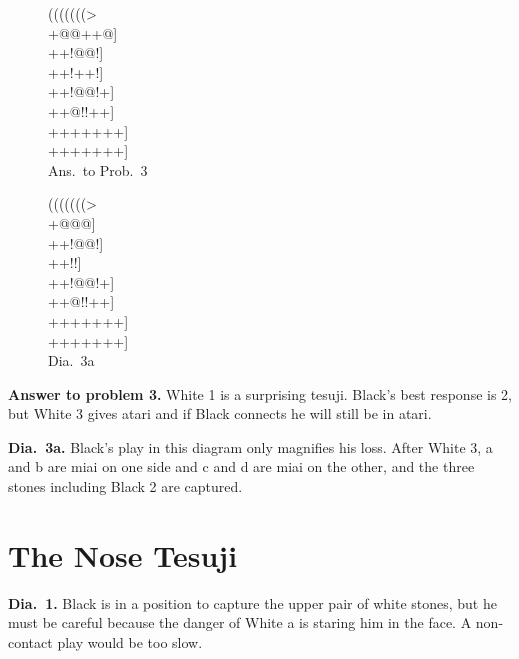 \documentclass[mcrownvopaper,10pt,twopage,onecolumn,final]{memoir}
\begin{document}
\begin{figure}[ht]
    \begin{minipage}[c]{0.50\linewidth}
        \centering    
        {\gnos%
        (((((((>\\
        +@@+{\gnosb{}}+@]\\
        ++!@{\gnosw{}}@!]\\
        ++!+{\gnosw{}}+!]\\
        ++!@@!+]\\
        ++@!!++]\\
        +++++++]\\
        +++++++]\\
        }
        Ans.\ to Prob.\ 3
    \end{minipage}%
    \begin{minipage}[c]{0.50\linewidth}
        \centering    
        {\gnos%
        (((((((>\\
        +@@@]\\
        ++!@{\gnosw{}}@!]\\
        ++!!]\\
        ++!@@!+]\\
        ++@!!++]\\
        +++++++]\\
        +++++++]\\
        }
        Dia.\ 3a
    \end{minipage}
\end{figure}

\noindent
\textbf{Answer to problem 3.} White 1 is a surprising tesuji. Black's best
response is 2, but White 3 gives atari and if Black connects he will still
be in atari.

\noindent
\textbf{Dia.\ 3a.} Black's play in this diagram only magnifies his loss. After
White 3, a and b are miai on one side and c and d are miai on the other,
and the three stones including Black 2 are captured.

\section{The Nose Tesuji}

\textbf{Dia.\ 1.} Black is in a position to capture the upper pair of white stones,
but he must be careful because the danger of White a is staring him in
the face. A non-contact play would be too slow.
\end{document}
